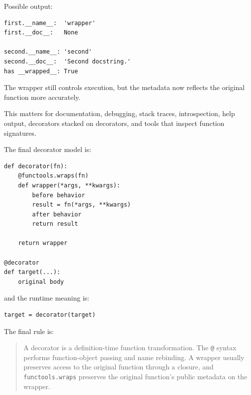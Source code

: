 Possible output:

\begin{verbatim}
first.__name__:  'wrapper'
first.__doc__:   None

second.__name__: 'second'
second.__doc__:  'Second docstring.'
has __wrapped__: True
\end{verbatim}

The wrapper still controls execution, but the metadata now reflects the original function more accurately.

This matters for documentation, debugging, stack traces, introspection, help output, decorators stacked on decorators, and tools that inspect function signatures.

The final decorator model is:

\begin{verbatim}
def decorator(fn):
    @functools.wraps(fn)
    def wrapper(*args, **kwargs):
        before behavior
        result = fn(*args, **kwargs)
        after behavior
        return result

    return wrapper

@decorator
def target(...):
    original body
\end{verbatim}

and the runtime meaning is:

\begin{verbatim}
target = decorator(target)
\end{verbatim}

The final rule is:

\begin{quote}
A decorator is a definition-time function transformation. The \texttt{@} syntax performs function-object passing and name rebinding. A wrapper usually preserves access to the original function through a closure, and \texttt{functools.wraps} preserves the original function's public metadata on the wrapper.
\end{quote}